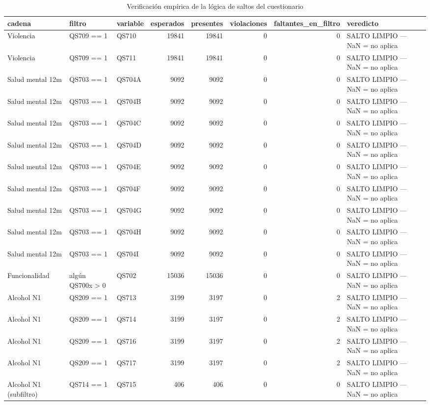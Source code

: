 \begin{table}[htbp]
\caption{Verificación empírica de la lógica de saltos del cuestionario}
\label{tab:tabla_02_verificacion_saltos}
\begin{tabular}{lllrrrrl}
\toprule
cadena & filtro & variable & esperados & presentes & violaciones & faltantes\_en\_filtro & veredicto \\
\midrule
Violencia & QS709 == 1 & QS710 & 19841 & 19841 & 0 & 0 & SALTO LIMPIO — NaN = no aplica \\
Violencia & QS709 == 1 & QS711 & 19841 & 19841 & 0 & 0 & SALTO LIMPIO — NaN = no aplica \\
Salud mental 12m & QS703 == 1 & QS704A & 9092 & 9092 & 0 & 0 & SALTO LIMPIO — NaN = no aplica \\
Salud mental 12m & QS703 == 1 & QS704B & 9092 & 9092 & 0 & 0 & SALTO LIMPIO — NaN = no aplica \\
Salud mental 12m & QS703 == 1 & QS704C & 9092 & 9092 & 0 & 0 & SALTO LIMPIO — NaN = no aplica \\
Salud mental 12m & QS703 == 1 & QS704D & 9092 & 9092 & 0 & 0 & SALTO LIMPIO — NaN = no aplica \\
Salud mental 12m & QS703 == 1 & QS704E & 9092 & 9092 & 0 & 0 & SALTO LIMPIO — NaN = no aplica \\
Salud mental 12m & QS703 == 1 & QS704F & 9092 & 9092 & 0 & 0 & SALTO LIMPIO — NaN = no aplica \\
Salud mental 12m & QS703 == 1 & QS704G & 9092 & 9092 & 0 & 0 & SALTO LIMPIO — NaN = no aplica \\
Salud mental 12m & QS703 == 1 & QS704H & 9092 & 9092 & 0 & 0 & SALTO LIMPIO — NaN = no aplica \\
Salud mental 12m & QS703 == 1 & QS704I & 9092 & 9092 & 0 & 0 & SALTO LIMPIO — NaN = no aplica \\
Funcionalidad & algún QS700x > 0 & QS702 & 15036 & 15036 & 0 & 0 & SALTO LIMPIO — NaN = no aplica \\
Alcohol N1 & QS209 == 1 & QS713 & 3199 & 3197 & 0 & 2 & SALTO LIMPIO — NaN = no aplica \\
Alcohol N1 & QS209 == 1 & QS714 & 3199 & 3197 & 0 & 2 & SALTO LIMPIO — NaN = no aplica \\
Alcohol N1 & QS209 == 1 & QS716 & 3199 & 3197 & 0 & 2 & SALTO LIMPIO — NaN = no aplica \\
Alcohol N1 & QS209 == 1 & QS717 & 3199 & 3197 & 0 & 2 & SALTO LIMPIO — NaN = no aplica \\
Alcohol N1 (subfiltro) & QS714 == 1 & QS715 & 406 & 406 & 0 & 0 & SALTO LIMPIO — NaN = no aplica \\

\end{tabular}
\end{table}
